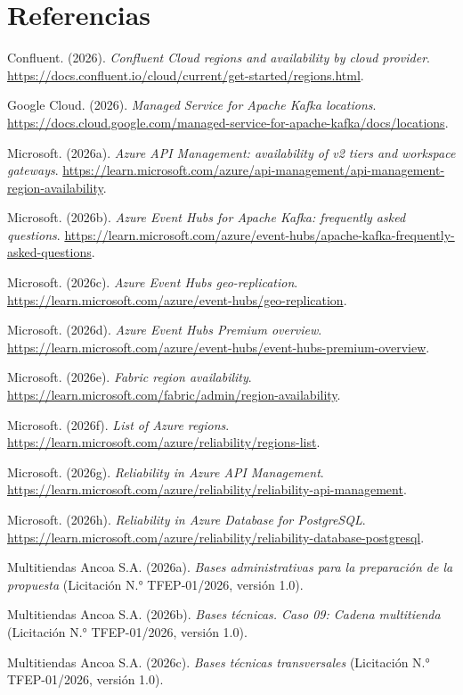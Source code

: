 \documentclass[11pt]{article}
\begin{document}
\section*{Referencias}

Confluent. (2026). \textit{Confluent Cloud regions and availability by cloud provider}. \url{https://docs.confluent.io/cloud/current/get-started/regions.html}.

Google Cloud. (2026). \textit{Managed Service for Apache Kafka locations}. \url{https://docs.cloud.google.com/managed-service-for-apache-kafka/docs/locations}.

Microsoft. (2026a). \textit{Azure API Management: availability of v2 tiers and workspace gateways}. \url{https://learn.microsoft.com/azure/api-management/api-management-region-availability}.

Microsoft. (2026b). \textit{Azure Event Hubs for Apache Kafka: frequently asked questions}. \url{https://learn.microsoft.com/azure/event-hubs/apache-kafka-frequently-asked-questions}.

Microsoft. (2026c). \textit{Azure Event Hubs geo-replication}. \url{https://learn.microsoft.com/azure/event-hubs/geo-replication}.

Microsoft. (2026d). \textit{Azure Event Hubs Premium overview}. \url{https://learn.microsoft.com/azure/event-hubs/event-hubs-premium-overview}.

Microsoft. (2026e). \textit{Fabric region availability}. \url{https://learn.microsoft.com/fabric/admin/region-availability}.

Microsoft. (2026f). \textit{List of Azure regions}. \url{https://learn.microsoft.com/azure/reliability/regions-list}.

Microsoft. (2026g). \textit{Reliability in Azure API Management}. \url{https://learn.microsoft.com/azure/reliability/reliability-api-management}.

Microsoft. (2026h). \textit{Reliability in Azure Database for PostgreSQL}. \url{https://learn.microsoft.com/azure/reliability/reliability-database-postgresql}.

Multitiendas Ancoa S.A. (2026a). \textit{Bases administrativas para la preparación de la propuesta} (Licitación N.° TFEP-01/2026, versión 1.0).

Multitiendas Ancoa S.A. (2026b). \textit{Bases técnicas. Caso 09: Cadena multitienda} (Licitación N.° TFEP-01/2026, versión 1.0).

Multitiendas Ancoa S.A. (2026c). \textit{Bases técnicas transversales} (Licitación N.° TFEP-01/2026, versión 1.0).
\end{document}
